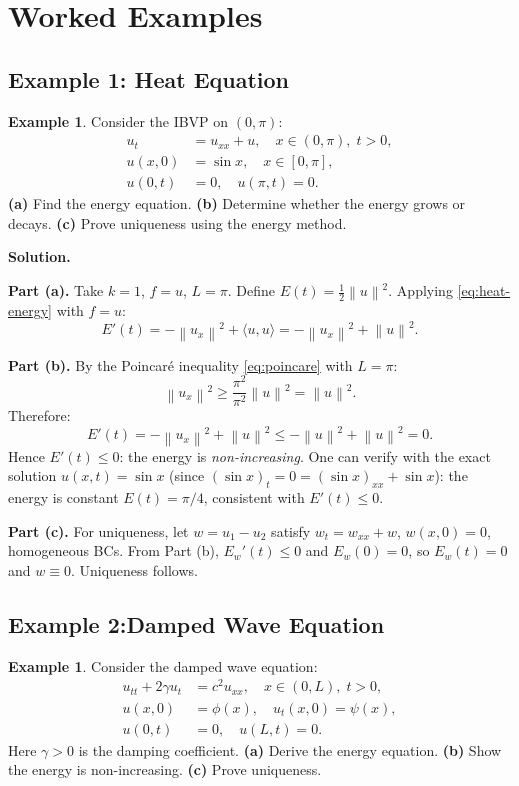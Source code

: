 \documentclass[12pt,a4paper]{article}
\theoremstyle{plain}
\theoremstyle{definition}
\newtheorem{example}[theorem]{Example}
\newcommand{\norm}[1]{\left\lVert #1 \right\rVert}
\begin{document}
\section{Worked Examples}
\label{sec:examples}

\subsection{Example 1: Heat Equation}

\begin{example}
\label{ex:heat-reaction}
Consider the IBVP on $(0,\pi)$:
\begin{align*}
  u_t &= u_{xx} + u, \quad x\in(0,\pi),\; t>0,\\
  u(x,0) &= \sin x, \quad x\in[0,\pi],\\
  u(0,t) &= 0, \quad u(\pi,t) = 0.
\end{align*}
\textbf{(a)} Find the energy equation.
\textbf{(b)} Determine whether the energy grows or decays.
\textbf{(c)} Prove uniqueness using the energy method.
\end{example}

\textbf{Solution.}

\textbf{Part (a).} Take $k=1$, $f=u$, $L=\pi$. Define $E(t)=\tfrac{1}{2}\norm{u}^2$.
Applying \eqref{eq:heat-energy} with $f=u$:
\[
  E'(t) = -\norm{u_x}^2 + \langle u,u\rangle = -\norm{u_x}^2 + \norm{u}^2.
\]

\textbf{Part (b).} By the Poincar\'{e} inequality \eqref{eq:poincare} with $L=\pi$:
\[
  \norm{u_x}^2 \geq \frac{\pi^2}{\pi^2}\norm{u}^2 = \norm{u}^2.
\]
Therefore:
\[
  E'(t) = -\norm{u_x}^2 + \norm{u}^2 \leq -\norm{u}^2 + \norm{u}^2 = 0.
\]
Hence $E'(t)\leq 0$: the energy is \emph{non-increasing}. One can verify with the
exact solution $u(x,t)=\sin x$ (since $(\sin x)_t=0=(\sin x)_{xx}+\sin x$): the
energy is constant $E(t)=\pi/4$, consistent with $E'(t)\leq 0$.

\textbf{Part (c).} For uniqueness, let $w=u_1-u_2$ satisfy $w_t=w_{xx}+w$,
$w(x,0)=0$, homogeneous BCs. From Part (b), $E_w'(t)\leq 0$ and $E_w(0)=0$,
so $E_w(t)=0$ and $w\equiv 0$. Uniqueness follows.

\subsection{Example 2:Damped Wave Equation}

\begin{example}
\label{ex:damped-wave}
Consider the damped wave equation:
\begin{align*}
  u_{tt} + 2\gamma u_t &= c^2 u_{xx}, \quad x\in(0,L),\; t>0,\\
  u(x,0) &= \phi(x),\quad u_t(x,0)=\psi(x),\\
  u(0,t) &= 0,\quad u(L,t)=0.
\end{align*}
Here $\gamma>0$ is the damping coefficient.
\textbf{(a)} Derive the energy equation.
\textbf{(b)} Show the energy is non-increasing.
\textbf{(c)} Prove uniqueness.
\end{example}
\end{document}
